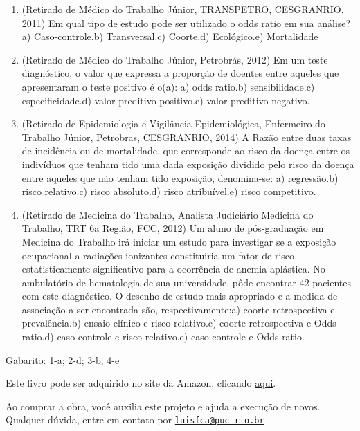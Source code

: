 \documentclass[
]{book}
\begin{document}
\begin{enumerate}
\def\labelenumi{\arabic{enumi}.}
\item
  (Retirado de Médico do Trabalho Júnior, TRANSPETRO, CESGRANRIO, 2011) Em qual tipo de estudo pode ser utilizado o odds ratio em sua análise?a) Caso-controle.b) Transversal.c) Coorte.d) Ecológico.e) Mortalidade
\item
  (Retirado de Médico do Trabalho Júnior, Petrobrás, 2012) Em um teste diagnóstico, o valor que expressa a proporção de doentes entre aqueles que apresentaram o teste positivo é o(a): a) odds ratio.b) sensibilidade.c) especificidade.d) valor preditivo positivo.e) valor preditivo negativo.
\item
  (Retirado de Epidemiologia e Vigilância Epidemiológica, Enfermeiro do Trabalho Júnior, Petrobras, CESGRANRIO, 2014) A Razão entre duas taxas de incidência ou de mortalidade, que corresponde ao risco da doença entre os indivíduos que tenham tido uma dada exposição dividido pelo risco da doença entre aqueles que não tenham tido exposição, denomina-se: a) regressão.b) risco relativo.c) risco absoluto.d) risco atribuível.e) risco competitivo.
\item
  (Retirado de Medicina do Trabalho, Analista Judiciário Medicina do Trabalho, TRT 6a Região, FCC, 2012) Um aluno de pós-graduação em Medicina do Trabalho irá iniciar um estudo para investigar se a exposição ocupacional a radiações ionizantes constituiria um fator de risco estatisticamente significativo para a ocorrência de anemia aplástica. No ambulatório de hematologia de sua universidade, pôde encontrar 42 pacientes com este diagnóstico. O desenho de estudo mais apropriado e a medida de associação a ser encontrada são, respectivamente:a) coorte retrospectiva e prevalência.b) ensaio clínico e risco relativo.c) coorte retrospectiva e Odds ratio.d) caso-controle e risco relativo.e) caso-controle e Odds ratio.
\end{enumerate}

Gabarito: 1-a; 2-d; 3-b; 4-e

Este livro pode ser adquirido no site da Amazon, clicando \href{https://www.amazon.com.br/gp/product/B097CP7T9M?pf_rd_r=RDZC8XYMBC1WY69T0J8K\&pf_rd_p=abb22e6b-8812-4b76-a424-5f0b098d2c90\&pd_rd_r=ceec1911-f409-4acd-ac8f-2d5bc68dac43\&pd_rd_w=wMUzJ\&pd_rd_wg=ZK85a\&ref_=pd_gw_unk}{aqui}.

Ao comprar a obra, você auxilia este projeto e ajuda a execução de novos. Qualquer dúvida, entre em contato por \href{mailto:luisfca@puc-rio.br}{\nolinkurl{luisfca@puc-rio.br}}
\end{document}
